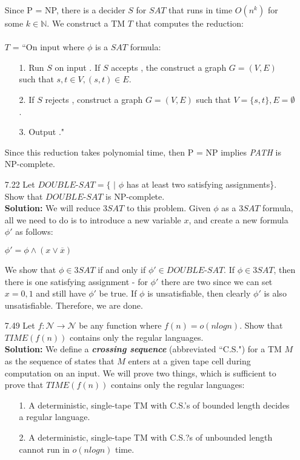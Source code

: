 \begin{enumerate}
\par Since P = NP, there is a decider $S$ for $SAT$ that runs in time $O(n^k)$ for some $k \in \mathbb{N}$. We construct a TM $T$ that computes the reduction:
\\ \\
$T$ = ``On input \angles{\phi} where $\phi$ is a $SAT$ formula:
\begin{enumerate}
\item[1.]Run $S$ on input \angles{\phi}. If $S$ accepts \angles{\phi}, the construct a graph $G = (V, E)$ such that $s, t \in V, (s, t) \in E$.
\item[2.]If $S$ rejects \angles{\phi}, construct a graph $G = (V, E)$ such that $V = \{s, t\}, E = \emptyset$.
\item[3.]Output ."
\end{enumerate}
Since this reduction takes polynomial time, then P = NP implies \emph{PATH} is NP-complete.

\item[7.22]Let $DOUBLE$-$SAT = \{$\angles{\phi} $|$ $\phi$ has at least two satisfying assignments\}. Show that $DOUBLE$-$SAT$ is NP-complete.
\\
\textbf{Solution:} We will reduce $3SAT$ to this problem. Given $\phi$ as a $3SAT$ formula, all we need to do is to introduce a new variable $x$, and create a new formula $\phi'$ as follows:
\begin{center}
$\phi' = \phi \wedge (x \vee \overline{x})$
\end{center}
We show that $\phi \in 3SAT$ if and only if $\phi' \in DOUBLE$-$SAT$. If $\phi \in 3SAT$, then there is one satisfying assignment - for $\phi'$ there are two since we can set $x = 0, 1$ and still have $\phi'$ be true. If $\phi$ is unsatisfiable, then clearly $\phi'$ is also unsatisfiable. Therefore, we are done.

\item[7.49]Let $f: \mathcal{N} \rightarrow \mathcal{N}$ be any function where $f(n) = o(n log n)$. Show that $TIME(f(n))$ contains only the regular languages.
\\
\textbf{Solution:} We define a \textbf{\emph{crossing sequence}} (abbreviated ``C.S.") for a TM $M$ as the sequence of states that $M$ enters at a given tape cell during computation on an input. We will prove two things, which is sufficient to prove that $TIME(f(n))$ contains only the regular languages:
\begin{enumerate}
\item[1.]A deterministic, single-tape TM with C.S.'s of bounded length decides a regular language.
\item[2.]A deterministic, single-tape TM with C.S.?s of unbounded length cannot run in $o(n log n)$ time. 
\end{enumerate}


\end{enumerate}
